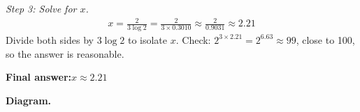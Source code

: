 \documentclass[11pt]{article}
\begin{document}
\textit{Step 3: Solve for \( x \).}
\[\begin{gathered}
x = \frac{2}{3\log 2} = \frac{2}{3 \times 0.3010} \approx \frac{2}{0.9031} \approx 2.21
\end{gathered}\]
Divide both sides by \( 3\log 2 \) to isolate \( x \). Check: \( 2^{3 \times 2.21} = 2^{6.63} \approx 99 \), close to 100, so the answer is reasonable.

\begin{answerbox}
\textbf{Final answer:}\quad \(\displaystyle  x \approx 2.21 \)
\end{answerbox}
\textbf{Diagram.}

\begin{center}
\end{center}
\end{document}
